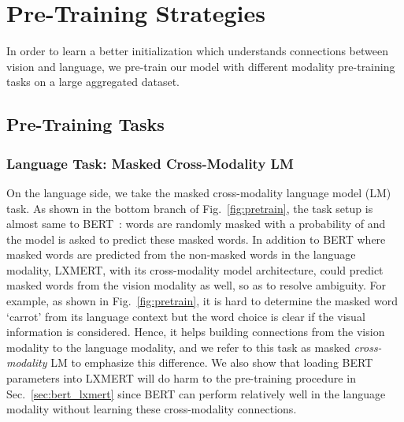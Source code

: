 \documentclass[11pt,a4paper]{article}
\begin{document}
\section{Pre-Training Strategies}
In order to learn a better initialization which understands connections between vision and language, we pre-train our model with different modality pre-training 
tasks on a large aggregated dataset.
\subsection{Pre-Training Tasks}\label{sec:pretrain_task}
\subsubsection{Language Task:  Masked Cross-Modality LM}
\label{sec:l_task}
On the language side, we take the masked cross-modality language model (LM) task. 
As shown in the bottom branch of Fig.~\ref{fig:pretrain}, the task setup is almost same to BERT~\cite{devlin2018bert}:
words are randomly masked with a probability of  and the model is asked to predict these masked words.
In addition to BERT where masked words are predicted from the non-masked words in the language modality, LXMERT, with its cross-modality model architecture, could predict masked words from the vision modality as well, so as to resolve ambiguity.
For example, as shown in Fig.~\ref{fig:pretrain}, it is hard to determine the masked word `carrot' from its language context but the word choice is clear if the visual information is considered.
Hence, it helps building connections from the vision modality to the language modality, and we refer to this task as masked \emph{cross-modality} LM to emphasize this difference.
We also show that loading BERT parameters into LXMERT will do harm to the pre-training procedure in Sec.~\ref{sec:bert_lxmert} since BERT can perform relatively well in the language modality without learning these cross-modality connections.
\end{document}
